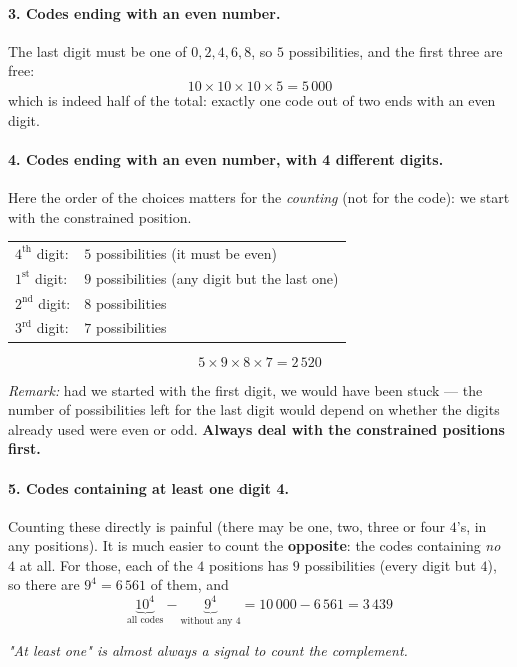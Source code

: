 \documentclass[]{article}
\begin{document}
	\paragraph{3. Codes ending with an even number.}
	The last digit must be one of $0, 2, 4, 6, 8$, so $5$ possibilities, and the first three are free:
	$$
	10 \times 10 \times 10 \times 5 = \boxed{5\,000}
	$$
	which is indeed half of the total: exactly one code out of two ends with an even digit.

	\paragraph{4. Codes ending with an even number, with 4 different digits.}
	Here the order of the choices matters for the \textit{counting} (not for the code): we start with the constrained position.
	\begin{center}
		\begin{tabular}{ll}
			$4^{\text{th}}$ digit: & $5$ possibilities (it must be even) \\
			$1^{\text{st}}$ digit: & $9$ possibilities (any digit but the last one) \\
			$2^{\text{nd}}$ digit: & $8$ possibilities \\
			$3^{\text{rd}}$ digit: & $7$ possibilities
		\end{tabular}
	\end{center}
	$$
	5 \times 9 \times 8 \times 7 = \boxed{2\,520}
	$$

	\textit{Remark:} had we started with the first digit, we would have been stuck --- the number of possibilities left for the last digit would depend on whether the digits already used were even or odd.
	\textbf{Always deal with the constrained positions first.}

	\paragraph{5. Codes containing at least one digit 4.}
	Counting these directly is painful (there may be one, two, three or four $4$'s, in any positions).
	It is much easier to count the \textbf{opposite}: the codes containing \textit{no} $4$ at all.
	For those, each of the $4$ positions has $9$ possibilities (every digit but $4$), so there are $9^4 = 6\,561$ of them, and
	$$
	\underbrace{10^4}_{\text{all codes}} - \underbrace{9^4}_{\text{without any } 4} = 10\,000 - 6\,561 = \boxed{3\,439}
	$$

	\textit{"At least one" is almost always a signal to count the complement.}
\end{document}
